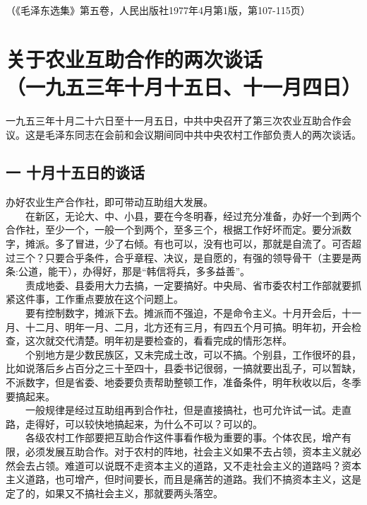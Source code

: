 \documentclass[cn,11pt,chinese]{elegantbook}
\def\myformat#1{\hfil\hfil #1}
\begin{document}
\begin{flushright}（《毛泽东选集》第五卷，人民出版社1977年4月第1版，第107-115页）\end{flushright}
\newpage\section*{\myformat{关于农业互助合作的两次谈话}\\\myformat{（一九五三年十月十五日、十一月四日）}}
\begin{introduction}\item  一九五三年十月二十六日至十一月五日，中共中央召开了第三次农业互助合作会议。这是毛泽东同志在会前和会议期间同中共中央农村工作部负责人的两次谈话。\end{introduction}
\subsection*{\myformat{一 十月十五日的谈话}}
办好农业生产合作社，即可带动互助组大发展。\\
　　在新区，无论大、中、小县，要在今冬明春，经过充分准备，办好一个到两个合作社，至少一个，一般一个到两个，至多三个，根据工作好坏而定。要分派数字，摊派。多了冒进，少了右倾。有也可以，没有也可以，那就是自流了。可否超过三个？只要合乎条件，合乎章程、决议，是自愿的，有强的领导骨干（主要是两条:公道，能干），办得好，那是“韩信将兵，多多益善”。\\
　　责成地委、县委用大力去搞，一定要搞好。中央局、省市委农村工作部就要抓紧这件事，工作重点要放在这个问题上。\\
　　要有控制数字，摊派下去。摊派而不强迫，不是命令主义。十月开会后，十一月、十二月、明年一月、二月，北方还有三月，有四五个月可搞。明年初，开会检查，这次就交代清楚。明年初是要检查的，看看完成的情形怎样。\\
　　个别地方是少数民族区，又未完成土改，可以不搞。个别县，工作很坏的县，比如说落后乡占百分之三十至四十，县委书记很弱，一搞就要出乱子，可以暂缺，不派数字，但是省委、地委要负责帮助整顿工作，准备条件，明年秋收以后，冬季要搞起来。\\
　　一般规律是经过互助组再到合作社，但是直接搞社，也可允许试一试。走直路，走得好，可以较快地搞起来，为什么不可以？可以的。\\
　　各级农村工作部要把互助合作这件事看作极为重要的事。个体农民，增产有限，必须发展互助合作。对于农村的阵地，社会主义如果不去占领，资本主义就必然会去占领。难道可以说既不走资本主义的道路，又不走社会主义的道路吗？资本主义道路，也可增产，但时间要长，而且是痛苦的道路。我们不搞资本主义，这是定了的，如果又不搞社会主义，那就要两头落空。\\
\end{document}
